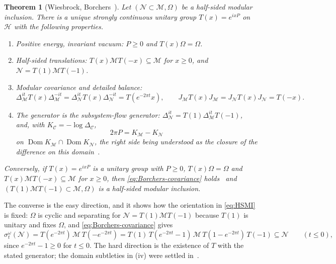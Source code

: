 \documentclass[a4paper,11pt]{article}
\newtheorem{theorem}{Theorem}
\theoremstyle{definition}
\newcommand{\mN}{\mathcal{N}}
\newcommand{\mM}{\mathcal{M}}
\begin{document}
\begin{theorem}[Wiesbrock, Borchers~{\cite{Wiesbrock1993,Borchers1992,ArakiZsido2005}}]\label{thm:HSMI}
Let $(\mN\subset\mM,\Omega)$ be a half-sided modular inclusion. There is a unique strongly continuous unitary group $T(x)=e^{ixP}$ on $\mathcal H$ with the following properties.
\begin{enumerate}
 \item[\rm(i)] \emph{Positive energy, invariant vacuum:} $P\ge0$ and $T(x)\Omega=\Omega$.
 \item[\rm(ii)] \emph{Half-sided translations:} $T(x)\mM T(-x)\subseteq\mM$ for $x\ge0$, and $\mN=T(1)\mM T(-1)$.
 \item[\rm(iii)] \emph{Modular covariance and detailed balance:}
 \begin{equation}
  \Delta_{\mM}^{it}T(x)\Delta_{\mM}^{-it}=\Delta_{\mN}^{it}T(x)\Delta_{\mN}^{-it}=T(e^{-2\pi t}x),
  \qquad
  J_{\mM}T(x)J_{\mM}=J_{\mN}T(x)J_{\mN}=T(-x).
  \label{eq:Borchers-covariance}
 \end{equation}
 \item[\rm(iv)] \emph{The generator is the subsystem-flow generator:} $\Delta_{\mN}^{it}=T(1)\Delta_{\mM}^{it}T(-1)$, and, with $K_{\mathcal C}=-\log\Delta_{\mathcal C}$,
 \begin{equation}
  2\pi P=K_{\mM}-K_{\mN}
  \label{eq:HSMI-P}
 \end{equation}
 on $\operatorname{Dom}K_{\mM}\cap\operatorname{Dom}K_{\mN}$, the right side being understood as the closure of the difference on this domain~\cite{ArakiZsido2005}.
\end{enumerate}
Conversely, if $T(x)=e^{ixP}$ is a unitary group with $P\ge0$, $T(x)\Omega=\Omega$ and $T(x)\mM T(-x)\subseteq\mM$ for $x\ge0$, then \eqref{eq:Borchers-covariance} holds~\cite{Borchers1992} and $(T(1)\mM T(-1)\subset\mM,\Omega)$ is a half-sided modular inclusion.
\end{theorem}

The converse is the easy direction, and it shows how the orientation in \eqref{eq:HSMI} is fixed: $\Omega$ is cyclic and separating for $\mN=T(1)\mM T(-1)$ because $T(1)$ is unitary and fixes $\Omega$, and \eqref{eq:Borchers-covariance} gives
\begin{equation}
 \sigma^\omega_t(\mN)=T(e^{-2\pi t})\,\mM\,T(-e^{-2\pi t})
 =T(1)\,T(e^{-2\pi t}-1)\,\mM\,T(1-e^{-2\pi t})\,T(-1)\subseteq\mN
 \qquad(t\le0),
 \label{eq:HSMI-orbit}
\end{equation}
since $e^{-2\pi t}-1\ge0$ for $t\le0$. The hard direction is the existence of $T$ with the stated generator; the domain subtleties in (iv) were settled in~\cite{ArakiZsido2005}.
\end{document}
